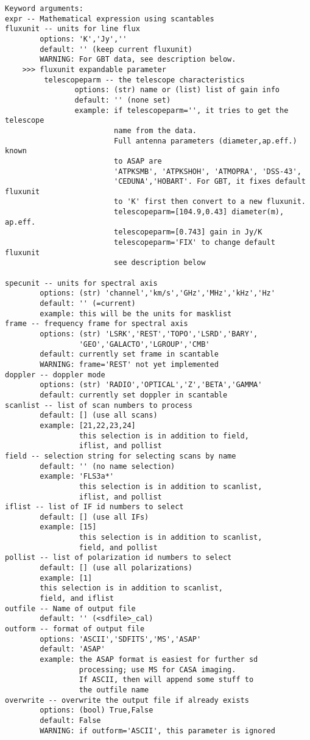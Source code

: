 \begin{verbatim}
Keyword arguments:
expr -- Mathematical expression using scantables 
fluxunit -- units for line flux
        options: 'K','Jy',''
        default: '' (keep current fluxunit)
        WARNING: For GBT data, see description below.
    >>> fluxunit expandable parameter
         telescopeparm -- the telescope characteristics
                options: (str) name or (list) list of gain info
                default: '' (none set)
                example: if telescopeparm='', it tries to get the telescope
                         name from the data.
                         Full antenna parameters (diameter,ap.eff.) known
                         to ASAP are
                         'ATPKSMB', 'ATPKSHOH', 'ATMOPRA', 'DSS-43',
                         'CEDUNA','HOBART'. For GBT, it fixes default fluxunit
                         to 'K' first then convert to a new fluxunit.
                         telescopeparm=[104.9,0.43] diameter(m), ap.eff.
                         telescopeparm=[0.743] gain in Jy/K
                         telescopeparm='FIX' to change default fluxunit
                         see description below

specunit -- units for spectral axis
        options: (str) 'channel','km/s','GHz','MHz','kHz','Hz'
        default: '' (=current)
        example: this will be the units for masklist
frame -- frequency frame for spectral axis
        options: (str) 'LSRK','REST','TOPO','LSRD','BARY',
                 'GEO','GALACTO','LGROUP','CMB'
        default: currently set frame in scantable
        WARNING: frame='REST' not yet implemented
doppler -- doppler mode
        options: (str) 'RADIO','OPTICAL','Z','BETA','GAMMA'
        default: currently set doppler in scantable
scanlist -- list of scan numbers to process
        default: [] (use all scans)
        example: [21,22,23,24]
                 this selection is in addition to field,
                 iflist, and pollist
field -- selection string for selecting scans by name
        default: '' (no name selection)
        example: 'FLS3a*'
                 this selection is in addition to scanlist,
                 iflist, and pollist
iflist -- list of IF id numbers to select
        default: [] (use all IFs)
        example: [15]
                 this selection is in addition to scanlist,
                 field, and pollist
pollist -- list of polarization id numbers to select
        default: [] (use all polarizations)
        example: [1]
        this selection is in addition to scanlist,
        field, and iflist
outfile -- Name of output file
        default: '' (<sdfile>_cal)
outform -- format of output file
        options: 'ASCII','SDFITS','MS','ASAP'
        default: 'ASAP'
        example: the ASAP format is easiest for further sd
                 processing; use MS for CASA imaging.
                 If ASCII, then will append some stuff to
                 the outfile name
overwrite -- overwrite the output file if already exists
        options: (bool) True,False
        default: False
        WARNING: if outform='ASCII', this parameter is ignored
\end{verbatim}

